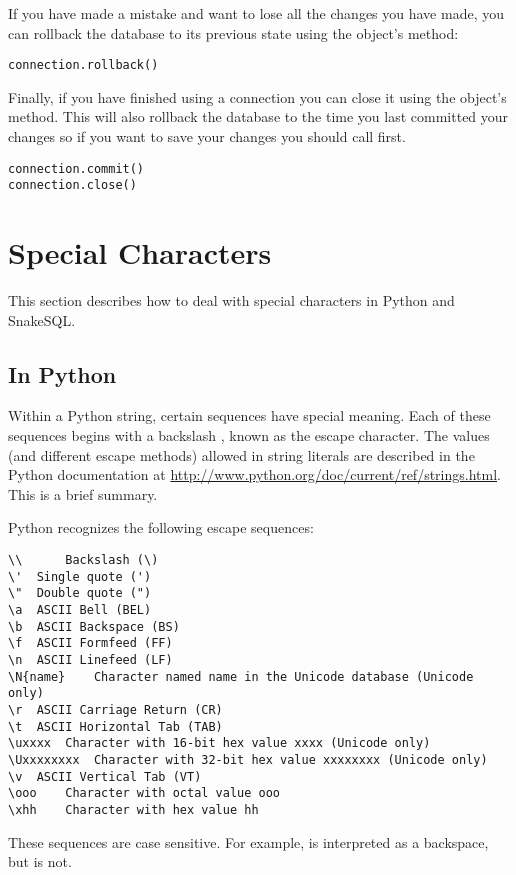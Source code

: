 \documentclass{howto}
\begin{document}
If you have made a mistake and want to lose all the changes you have made, you can rollback the database to its previous state using the  object's  method:

\begin{verbatim}
connection.rollback()
\end{verbatim}

Finally, if you have finished using a connection you can close it using the  object's  method. This will also rollback the database to the time you last committed your changes so if you want to save your changes you should call  first.

\begin{verbatim}
connection.commit()
connection.close()
\end{verbatim}


\section{Special Characters}

This section describes how to deal with special characters in Python and SnakeSQL. 

\subsection{In Python}

Within a Python string, certain sequences have special meaning. Each of these sequences begins with a backslash \code{\e}, known as the escape character. The values (and different escape methods) allowed in string literals are described in the Python documentation at \url{http://www.python.org/doc/current/ref/strings.html}. This is a brief summary.

Python recognizes the following escape sequences:
\begin{verbatim}
\\  	Backslash (\)  	
\' 	Single quote (') 	
\" 	Double quote (") 	
\a 	ASCII Bell (BEL) 	
\b 	ASCII Backspace (BS) 	
\f 	ASCII Formfeed (FF) 	
\n 	ASCII Linefeed (LF) 	
\N{name} 	Character named name in the Unicode database (Unicode only) 	
\r 	ASCII Carriage Return (CR) 	
\t 	ASCII Horizontal Tab (TAB) 	
\uxxxx 	Character with 16-bit hex value xxxx (Unicode only)
\Uxxxxxxxx 	Character with 32-bit hex value xxxxxxxx (Unicode only)
\v 	ASCII Vertical Tab (VT) 	
\ooo 	Character with octal value ooo 
\xhh 	Character with hex value hh 	
\end{verbatim}
These sequences are case sensitive. For example,  is interpreted as a backspace, but  is not. 
\end{document}
